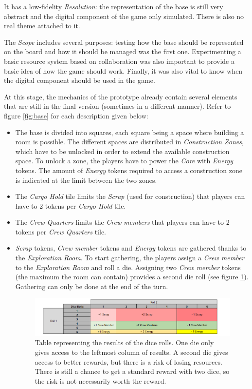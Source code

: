 It has a low-fidelity \textit{Resolution}: the representation of the base is still very abstract and the digital component of the game only simulated. There is also no real theme attached to it. 

The \textit{Scope} includes several purposes: testing how the base should be represented on the board and how it should be managed was the first one. Experimenting a basic resource system based on collaboration was also important to provide a basic idea of how the game should work. Finally, it was also vital to know when the digital component should be used in the game.

At this stage, the mechanics of the prototype already contain several elements that are still in the final version (sometimes in a different manner). Refer to figure \ref{fig:base} for each description given below:
\begin{itemize}
\item The base is divided into squares, each square being a space where building a room is possible. The different spaces are distributed in \textit{Construction Zones}, which have to be unlocked in order to extend the available construction space. To unlock a zone, the players have to power the \textit{Core} with \textit{Energy} tokens. The amount of \textit{Energy} tokens required to access a construction zone is indicated at the limit between the two zones.
\item The \textit{Cargo Hold} tile limits the \textit{Scrap} (used for construction) that players can have to 2 tokens per \textit{Cargo Hold} tile.
\item The \textit{Crew Quarters} limits the \textit{Crew members} that players can have to 2 tokens per \textit{Crew Quarters} tile.
\item \textit{Scrap} tokens, \textit{Crew member} tokens and \textit{Energy} tokens are gathered thanks to the \textit{Exploration Room}. To start gathering, the players assign a \textit{Crew member} to the \textit{Exploration Room} and roll a die. Assigning two \textit{Crew member} tokens (the maximum the room can contain) provides a second die roll (see figure \ref{fig:Dicetable}). Gathering can only be done at the end of the turn.
\begin{figure}[!ht]
    \centering
    \includegraphics[scale=0.6]{Images/DiceProto1.png}
    \caption{Table representing the results of the dice rolls. One die only gives access to the leftmost column of results. A second die gives access to better rewards, but there is a risk of losing resources. There is still a chance to get a standard reward with two dice, so the risk is not necessarily worth the reward.}
    \label{fig:Dicetable}
\end{figure}
\end{itemize}
